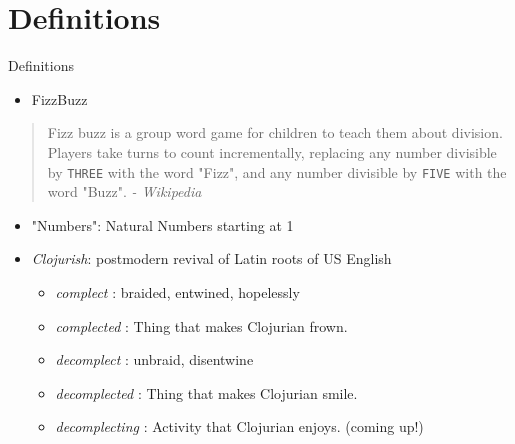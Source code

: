 \documentclass[presentation]{beamer}
\begin{document}
\section{Definitions}
\label{sec:org1cbf7d2}
\begin{frame}[label={sec:orgaba8d91},fragile]{Definitions}
 \begin{itemize}
\item \alert{FizzBuzz}
\end{itemize}
\begin{quote}
Fizz buzz is a group word game for children
to teach them about division. Players take
turns to count incrementally, replacing any
number divisible by \texttt{THREE} with the word
"Fizz", and any number divisible by \texttt{FIVE}
with the word "Buzz". \emph{- Wikipedia}
\end{quote}
\pause
\begin{itemize}
\item \alert{"Numbers"}: Natural Numbers starting at 1
\end{itemize}
\pause
\begin{itemize}
\item \alert{\emph{Clojurish}}: postmodern revival of
Latin roots of US English
\begin{itemize}
\item \emph{complect}      : braided, entwined, hopelessly
\item \emph{complected}    : Thing that makes Clojurian frown.
\item \emph{decomplect}    : unbraid, disentwine
\item \emph{decomplected}  : Thing that makes Clojurian smile.
\item \emph{decomplecting} : Activity that Clojurian enjoys.
(coming up!)
\end{itemize}
\end{itemize}
\end{frame}
\end{document}

